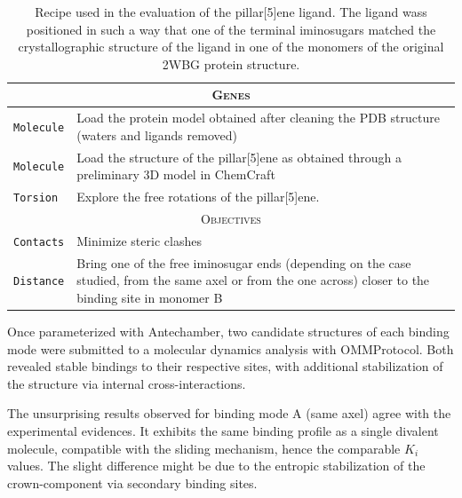 \begin{table}[hbtp]
	\caption[Pillar-5-ene recipe]{Recipe used in the evaluation of the pillar[5]ene ligand. The ligand wass positioned in such a way that one of the terminal iminosugars matched the crystallographic structure of the ligand in one of the monomers of the original 2WBG protein structure.}
	\label{table:recipe-rotaxane}
	\footnotesize
	\newcommand{\tableheading}[1]{\multicolumn{2}{c}{\textsc{#1}}}
	\begin{tabularx}{\textwidth}{RL}
		\toprule
		\tableheading{Genes}\\
		\toprule
		\texttt{Molecule} & Load the protein model obtained after cleaning the PDB structure\cite{pdb:2wbg} (waters and ligands removed) \\
		\midrule
		\texttt{Molecule} & Load the structure of the pillar[5]ene as obtained through a preliminary 3D model in ChemCraft \\
		\midrule
		\texttt{Torsion} & Explore the free rotations of the pillar[5]ene. \\
		\toprule
		\tableheading{Objectives}\\
		\toprule
		\texttt{Contacts} & Minimize steric clashes \\
		\midrule
		\texttt{Distance} & Bring one of the free iminosugar ends (depending on the case studied, from the same axel or from the one across) closer to the binding site in monomer B \\

		\bottomrule

	\end{tabularx}
\end{table}

Once parameterized with Antechamber,\cite{wang2001antechamber} two candidate structures of each binding mode were submitted to a molecular dynamics analysis with OMMProtocol. Both revealed stable bindings to their respective sites, with additional stabilization of the structure via internal cross-interactions.

The unsurprising results observed for binding mode A (same axel) agree with the experimental evidences. It exhibits the same binding profile as a single divalent molecule, compatible with the sliding mechanism, hence the comparable $K_{i}$ values. The slight difference might be due to the entropic stabilization of the crown-component via secondary binding sites.

